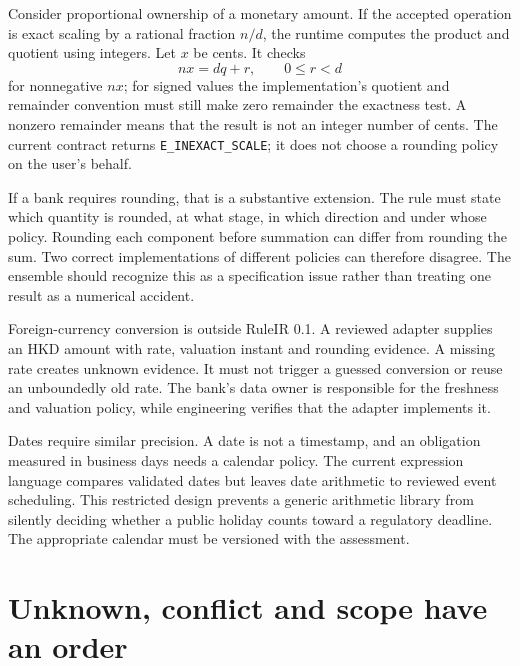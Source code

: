 Consider proportional ownership of a monetary amount. If the accepted operation
is exact scaling by a rational fraction $n/d$, the runtime computes the product
and quotient using integers. Let $x$ be cents. It checks
\begin{equation}
 nx=dq+r,\qquad 0\leq r<d
 \label{eq:exact-scale}
\end{equation}
for nonnegative $nx$; for signed values the implementation's quotient and
remainder convention must still make zero remainder the exactness test. A
nonzero remainder means that the result is not an integer number of cents. The
current contract returns \texttt{E\_INEXACT\_SCALE}; it does not choose a rounding
policy on the user's behalf.


If a bank requires rounding, that is a substantive extension. The rule must state
which quantity is rounded, at what stage, in which direction and under whose
policy. Rounding each component before summation can differ from rounding the
sum. Two correct implementations of different policies can therefore disagree.
The ensemble should recognize this as a specification issue rather than treating
one result as a numerical accident.

Foreign-currency conversion is outside RuleIR 0.1. A reviewed adapter supplies an
HKD amount with rate, valuation instant and rounding evidence. A missing rate
creates unknown evidence. It must not trigger a guessed conversion or reuse an
unboundedly old rate. The bank's data owner is responsible for the freshness and
valuation policy, while engineering verifies that the adapter implements it.

Dates require similar precision. A date is not a timestamp, and an obligation
measured in business days needs a calendar policy. The current expression
language compares validated dates but leaves date arithmetic to reviewed event
scheduling. This restricted design prevents a generic arithmetic library from
silently deciding whether a public holiday counts toward a regulatory deadline.
The appropriate calendar must be versioned with the assessment.

\section{Unknown, conflict and scope have an order}
\label{merge:M07:03}


